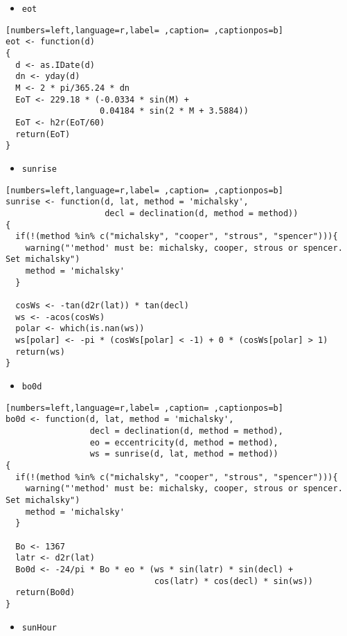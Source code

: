 \begin{itemize}
\item \texttt{eot}
\end{itemize}
\begin{lstlisting}[numbers=left,language=r,label= ,caption= ,captionpos=b]
eot <- function(d)
{
  d <- as.IDate(d)
  dn <- yday(d)
  M <- 2 * pi/365.24 * dn
  EoT <- 229.18 * (-0.0334 * sin(M) +
                   0.04184 * sin(2 * M + 3.5884))
  EoT <- h2r(EoT/60)
  return(EoT)
}
\end{lstlisting}
\begin{itemize}
\item \texttt{sunrise}
\end{itemize}
\begin{lstlisting}[numbers=left,language=r,label= ,caption= ,captionpos=b]
sunrise <- function(d, lat, method = 'michalsky',
                    decl = declination(d, method = method))
{
  if(!(method %in% c("michalsky", "cooper", "strous", "spencer"))){
    warning("'method' must be: michalsky, cooper, strous or spencer.
Set michalsky")
    method = 'michalsky'
  }
  
  cosWs <- -tan(d2r(lat)) * tan(decl)
  ws <- -acos(cosWs)
  polar <- which(is.nan(ws))
  ws[polar] <- -pi * (cosWs[polar] < -1) + 0 * (cosWs[polar] > 1)
  return(ws)
}
\end{lstlisting}
\begin{itemize}
\item \texttt{bo0d}
\end{itemize}
\begin{lstlisting}[numbers=left,language=r,label= ,caption= ,captionpos=b]
bo0d <- function(d, lat, method = 'michalsky',
                 decl = declination(d, method = method),
                 eo = eccentricity(d, method = method),
                 ws = sunrise(d, lat, method = method))
{
  if(!(method %in% c("michalsky", "cooper", "strous", "spencer"))){
    warning("'method' must be: michalsky, cooper, strous or spencer.
Set michalsky")
    method = 'michalsky'
  }

  Bo <- 1367
  latr <- d2r(lat)
  Bo0d <- -24/pi * Bo * eo * (ws * sin(latr) * sin(decl) +
                              cos(latr) * cos(decl) * sin(ws))
  return(Bo0d)
}
\end{lstlisting}
\begin{itemize}
\item \texttt{sunHour}
\end{itemize}
